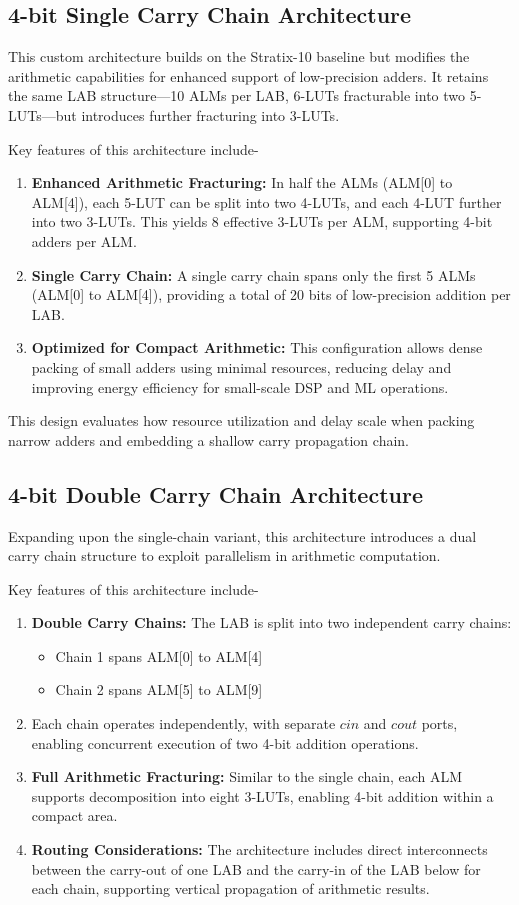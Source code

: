 \subsection{4-bit Single Carry Chain Architecture}
This custom architecture builds on the Stratix-10 baseline but modifies the arithmetic capabilities for enhanced support of low-precision adders. It retains the same LAB structure—10 ALMs per LAB, 6-LUTs fracturable into two 5-LUTs—but introduces further fracturing into 3-LUTs\cite{target-arch-2}.

Key features of this architecture include-
\begin{enumerate}
	\item \textbf{Enhanced Arithmetic Fracturing:} In half the ALMs (ALM[0] to ALM[4]), each 5-LUT can be split into two 4-LUTs, and each 4-LUT further into two 3-LUTs. This yields 8 effective 3-LUTs per ALM, supporting 4-bit adders per ALM.
	\item \textbf{Single Carry Chain:} A single carry chain spans only the first 5 ALMs (ALM[0] to ALM[4]), providing a total of 20 bits of low-precision addition per LAB.
	\item \textbf{Optimized for Compact Arithmetic:} This configuration allows dense packing of small adders using minimal resources, reducing delay and improving energy efficiency for small-scale DSP and ML operations.
\end{enumerate}

This design evaluates how resource utilization and delay scale when packing narrow adders and embedding a shallow carry propagation chain.

\subsection{4-bit Double Carry Chain Architecture}
Expanding upon the single-chain variant, this architecture introduces a dual carry chain structure to exploit parallelism in arithmetic computation\cite{target-arch-2}.

Key features of this architecture include-
\begin{enumerate}
	\item \textbf{Double Carry Chains:} The LAB is split into two independent carry chains:
	\begin{itemize}
		\item Chain 1 spans ALM[0] to ALM[4]
		\item Chain 2 spans ALM[5] to ALM[9]
	\end{itemize}
	\item Each chain operates independently, with separate $cin$ and $cout$ ports, enabling concurrent execution of two 4-bit addition operations.
	\item \textbf{Full Arithmetic Fracturing:} Similar to the single chain, each ALM supports decomposition into eight 3-LUTs, enabling 4-bit addition within a compact area.
	\item \textbf{Routing Considerations:} The architecture includes direct interconnects between the carry-out of one LAB and the carry-in of the LAB below for each chain, supporting vertical propagation of arithmetic results.
\end{enumerate}

